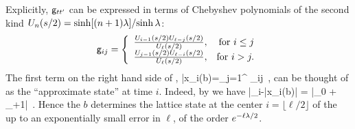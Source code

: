 \documentclass[12pt]{iopart}
\begin{document}
Explicitly,  $\mathsf{g}_{tt'}$ can be expressed in terms of Chebyshev
polynomials of the second kind
$U_n(s/2)={\sinh[(n+1)\lambda]}/{\sinh \lambda}$:
\[
 \mathsf{g}_{ij}= \left\{\begin{array}{lr}
        \frac{U_{i-1}(s/2)U_{\ell-j}(s/2)}{U_{\ell}(s/2)}, & \mbox{for } i\leq j\\
        \frac{U_{j-1}(s/2)U_{\ell-i}(s/2)}{U_{\ell}(s/2)}, & \mbox{for } i> j .
        \end{array}\right.
\]
The first term on the right hand side of  ,
\beq
  \bar{x}_i({b})=\sum_{j=1}^{\ell} \gd_{ij}
\,,
can be thought of as the ``approximate state'' at time $i$. Indeed, by
 we have
\beq
 |\ssp_i-\bar{x}_i({b})|
 = \left|\ssp_0
   +  \ssp_{\ell+1}\right|
   \leq {}
\,.
Hence the {\brick} ${b}$ determines  the lattice state at
the center
$i=\lfloor\ell/2\rfloor$  of the \brick\,  up to an exponentially small
error in $\ell$, of the order $e^{-\ell\lambda/2}$.
\end{document}
